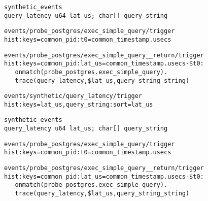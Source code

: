 \documentclass[usenames,dvipsnames, 18pt, compress, aspectratio=169]{beamer}
\begin{document}
\begin{frame}[fragile]{}
    \frametitle{}
    \begin{center}
    \begin{overprint}[14.5cm]
		\vspace{-0.73cm}
        \begin{verbatim}
synthetic_events
query_latency u64 lat_us; char[] query_string
        \end{verbatim}

		\vspace{-0.73cm}
        \begin{verbatim}
events/probe_postgres/exec_simple_query/trigger
hist:keys=common_pid:t0=common_timestamp.usecs
        \end{verbatim}

		\vspace{-0.73cm}
        \begin{verbatim}
events/probe_postgres/exec_simple_query__return/trigger
hist:keys=common_pid:lat_us=common_timestamp.usecs-$t0:
   onmatch(probe_postgres.exec_simple_query).
   trace(query_latency,$lat_us,query_string_string)
        \end{verbatim}

		\vspace{-0.73cm}
        \begin{verbatim}
events/synthetic/query_latency/trigger
hist:keys=lat_us,query_string:sort=lat_us
        \end{verbatim}

        \begin{verbatim}
synthetic_events
query_latency u64 lat_us; char[] query_string
        \end{verbatim}

		\vspace{-0.73cm}
        \begin{verbatim}
events/probe_postgres/exec_simple_query/trigger
hist:keys=common_pid:t0=common_timestamp.usecs
        \end{verbatim}

		\vspace{-0.73cm}
        \begin{verbatim}
events/probe_postgres/exec_simple_query__return/trigger
hist:keys=common_pid:lat_us=common_timestamp.usecs-$t0:
   onmatch(probe_postgres.exec_simple_query).
   trace(query_latency,$lat_us,query_string_string)
        \end{verbatim}


\end{overprint}
\end{center}
\end{frame}
\end{document}
